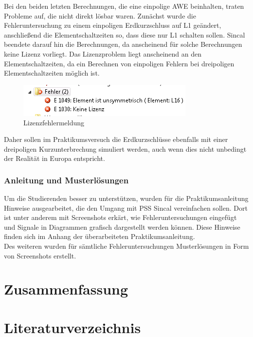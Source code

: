 \documentclass{scrartcl}
\begin{document}
\begin{onehalfspace}
Bei den beiden letzten Berechnungen, die eine einpolige AWE beinhalten, traten Probleme auf, die nicht direkt lösbar waren. Zunächst wurde die Fehleruntersuchung zu einem einpoligen Erdkurzschluss auf L1 geändert, anschließend die Elementschaltzeiten so, dass diese nur L1 schalten sollen. Sincal beendete darauf hin die Berechnungen, da anscheinend für solche Berechnungen keine Lizenz vorliegt. Das Lizenzproblem liegt anscheinend an den Elementschaltzeiten, da ein Berechnen von einpoligen Fehlern bei dreipoligen Elementschaltzeiten möglich ist.

	\begin{figure}[H]
	\centering
	\includegraphics[scale=1]{img/keine-lizenz.png}
	\caption{Lizenzfehlermeldung}
	\label{awe-oe}
	\end{figure}

Daher sollen im Praktikumsversuch die Erdkurzschlüsse ebenfalls mit einer dreipoligen Kurzunterbrechung simuliert werden, auch wenn dies nicht unbedingt der Realität in Europa entspricht.


\subsubsection{Anleitung und Musterlösungen}
Um die Studierenden besser zu unterstützen, wurden für die Praktikumsanleitung Hinweise ausgearbeitet, die den Umgang mit PSS Sincal vereinfachen sollen. Dort ist unter anderem mit Screenshots erkärt, wie Fehleruntersuchungen eingefügt und Signale in Diagrammen grafisch dargestellt werden können. Diese Hinweise finden sich im Anhang der überarbeiteten Praktikumsanleitung.\\
Des weiteren wurden für sämtliche Fehleruntersuchungen Musterlösungen in Form von Screenshots erstellt.

\section{Zusammenfassung}

\newpage
{}
\setcounter{page}{1}
\section{Literaturverzeichnis}





\end{onehalfspace}
\end{document}

